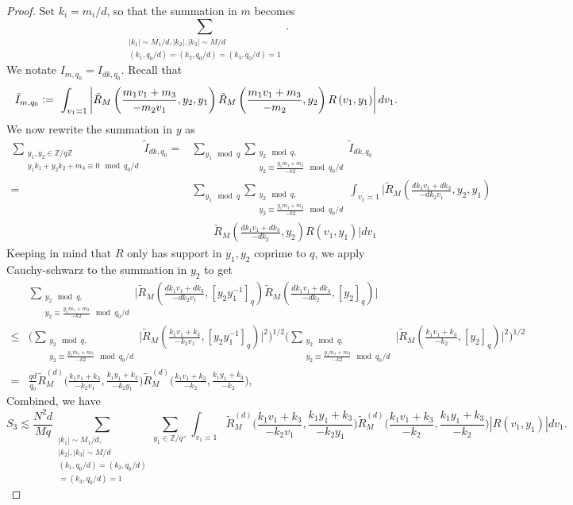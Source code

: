 \begin{proof}
    Set $k_i=m_i/d$, so that the summation in $m$ becomes \[
        \sum_{\substack{|k_1|\sim M_1/d,|k_2|,|k_3|\sim M/d\\
        (k_1,q_0/d)=(k_2,q_0/d)=(k_3,q_0/d)=1}}.
    \]We notate $I_{m,q_0}=I_{dk,q_0}$.
    Recall that \[
        \tilde{I}_{m,q_0}\defeq \ \int_{v_1\asymp 1} \left| \tilde{R}_M\left(\frac{m_1v_1+m_3}{-m_2v_1},y_2,y_1\right)
    \tilde{R}_M\left(\frac{m_1v_1+m_3}{-m_2},y_2\right)R\left(v_1,y_1\right)\right| dv_1.\]
    We now rewrite the summation in $y$ as \begin{align*}
        \sum_{\substack{y_1,y_2 \in\mathbb{Z}/q\mathbb{Z} \\ y_1k_1+y_2k_2+m_3\equiv 0 \mod q_0/d}}\tilde{I}_{d k ,q_0} =& \sum_{y_1\mod q} \sum_{\substack{y_2 \mod q,\\y_2\equiv \frac{y_1m_1+m_3}{-k2} \mod q_0/d}
        } \tilde{I}_{d k ,q_0}\\
        =&\sum_{y_1\mod q} \sum_{\substack{y_2 \mod q,\\y_2\equiv \frac{y_1m_1+m_3}{-k2} \mod q_0/d} }\int_{v_1\asymp 1} \Bigg| \tilde{R}_M\left(\frac{dk_1v_1+dk_3}{-dk_2v_1},y_2,y_1\right)\\
        & \quad \quad
        \tilde{R}_M\left(\frac{dk_1v_1+dk_3}{-dk_2},y_2\right)R\left(v_1,y_1\right)\Bigg| dv_1
    \end{align*}
    Keeping in mind that $R$ only has support in $y_1,y_2$ coprime to $q$, we apply Cauchy-schwarz to the summation in $y_2$ to get \begin{align*}
        &\sum_{\substack{y_2 \mod q,\\y_2\equiv \frac{y_1m_1+m_3}{-k2} \mod q_0/d} }\Bigg|\tilde{R}_M\left(\frac{dk_1v_1+dk_3}{-dk_2v_1},[y_2y_1^{-1}]_{q}\right)\tilde{R}_M\left(\frac{dk_1v_1+dk_3}{-dk_2},[y_2]_q\right)\Bigg|\\
        \leq &\Bigg(\sum_{\substack{y_2 \mod q,\\y_2\equiv \frac{y_1m_1+m_3}{-k2} \mod q_0/d} }\Big|\tilde{R}_M\left(\frac{k_1v_1+k_3}{-k_2v_1},[y_2y_1^{-1}]_{q}\right)\Big|^2\Bigg)^{1/2}
       \Bigg( \sum_{\substack{y_2 \mod q,\\y_2\equiv \frac{y_1m_1+m_3}{-k2} \mod q_0/d} }
        \Big|\tilde{R}_M\left(\frac{k_1v_1+k_3}{-k_2},[y_2]_q\right)\Big|^2 \Bigg)^{1/2}\\
        =&\frac{qd}{q_0}\tilde{R}_M^{(d)}\Big(\frac{k_1v_1+k_3}{-k_2v_1},\frac{k_1y_1+k_3}{-k_2y_1}\Big)\tilde{R}_M^{(d)}\Big(\frac{k_1v_1+k_3}{-k_2},\frac{k_1y_1+k_3}{-k_2}\Big),
    \end{align*} 
    Combined, we have \[
        S_3\lesssim \frac{N^2d}{Mq}
        \sum_{\substack{|k_1|\sim M_1/d,\\|k_2|,|k_3|\sim M/d\\
        (k_1,q_0/d)=(k_2,q_0/d)\\=(k_3,q_0/d)=1}} \sum_{y_1\in \mathbb{Z}/q^\times} \int_{v_1\asymp 1}
        \tilde{R}_M^{(d)}\Big(\frac{k_1v_1+k_3}{-k_2v_1},\frac{k_1y_1+k_3}{-k_2y_1}\Big)\tilde{R}_M^{(d)}\Big(\frac{k_1v_1+k_3}{-k_2},\frac{k_1y_1+k_3}{-k_2}\Big) |R(v_1,y_1)|dv_1.
    \]
\end{proof}


